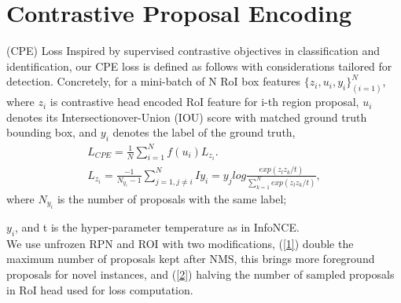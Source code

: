 \documentclass[12pt]{informs4}
\begin{document}
\tableofcontents
\newpage
\section{Contrastive Proposal Encoding}
(CPE) Loss Inspired by supervised contrastive objectives in classification and identification, our CPE loss is defined as follows with considerations tailored for detection. Concretely, for a mini-batch of N RoI box features $\{z_i,u_i,y_i\}_{(i=1)}^N$, where $z_i$ is contrastive head encoded RoI feature for i-th region proposal, $u_i$ denotes its Intersectionover-Union (IOU) score with matched ground truth bounding box, and $y_i$ denotes the label of the ground truth,\\
\begin{gather}
L_{CPE}=\frac{1}{N}\sum^N_{i=1}f(u_i)L_{z_i}. \label{1}\\
L_{z_i}=\frac{-1}{N_{y_i}-1}\sum^N_{j=1, j\neq{i}}I{y_i=y_j}log\frac{exp(z_l z_k/t)}{\sum^N_{k=1}exp(z_l z_k/t)}, \label{2}
\end{gather}
where $N_{y_i}$ is the number of proposals with the same label;

$y_i$, and t is the hyper-parameter temperature as in InfoNCE.\\

We use unfrozen RPN and ROI with two modifications, (\ref{1}) double the maximum number of proposals kept after NMS, this brings more foreground proposals for novel instances, and (\ref{2}) halving the number of sampled proposals in RoI head used for loss computation.
\end{document}
